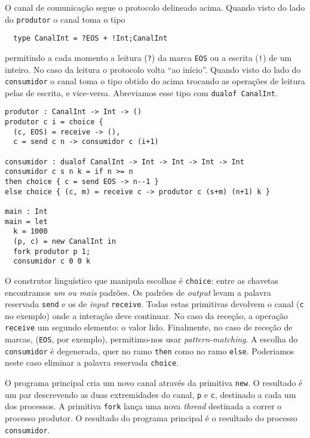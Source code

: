 O canal de comunicação segue o  protocolo delineado acima. Quando
visto do lado do \lstinline|produtor| o canal toma o tipo
%
\begin{lstlisting}
  type CanalInt = ?EOS + !Int;CanalInt
\end{lstlisting}
%
permitindo a cada momento a leitura (\lstinline|?|) da marca
\lstinline|EOS| ou a escrita (\lstinline|!|) de um inteiro. No caso da
leitura o protocolo volta ``ao início''.
%
Quando visto do lado do \lstinline|consumidor| o canal toma o tipo
obtido do acima trocando as operações de leitura pelas de escrita, e
vice-versa. Abreviamos esse tipo com \lstinline|dualof CanalInt|.

\begin{lstlisting}
produtor : CanalInt -> Int -> ()
produtor c i = choice {
  (c, EOS) = receive -> (),
  c = send c n -> consumidor c (i+1)

consumidor : dualof CanalInt -> Int -> Int -> Int -> Int
consumidor c s n k = if n >= n
then choice { c = send EOS -> n--1 }
else choice { (c, m) = receive c -> produtor c (s+m) (n+1) k }

main : Int
main = let
  k = 1000
  (p, c) = new CanalInt in
  fork produtor p 1;
  consumidor c 0 0 k
\end{lstlisting}

O construtor linguístico que manipula escolhas é \lstinline|choice|:
entre as chavetas encontramos \emph{um ou mais} padrões. Os padrões de
\textit{output} levam a palavra reservada \lstinline|send| e os de
\textit{input} \lstinline|receive|. Todas estas primitivas devolvem o
canal (\lstinline|c| no exemplo) onde a interação deve continuar. No
caso da receção, a operação \lstinline|receive| um segundo elemento: o
valor lido. Finalmente, no caso de receção de marcas,
(\lstinline|EOS|, por exemplo), permitimo-nos usar
\textit{pattern-matching}.
%
A escolha do \lstinline|consumidor| é degenerada, quer no ramo
\lstinline|then| como no ramo \lstinline|else|. Poderiamos neste caso
eliminar a palavra reservada \lstinline|choice|.

O programa principal cria um novo canal através da primitiva
\lstinline|new|. O resultado é um par descrevendo as duas extremidades
do canal, \lstinline|p| e \lstinline|c|, destinado a cada um dos
processos.
%
A primitiva \lstinline|fork| lança uma nova \textit{thread} destinada
a correr o processo produtor. O resultado do programa principal é o
resultado do processo \lstinline|consumidor|.

